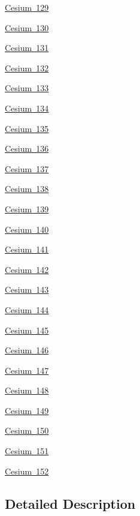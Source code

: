\begin{DoxyCompactItemize}
\item 
\mbox{\hyperlink{group___isotope_const-_cesium-_cs129}{Cesium 129}}
\item 
\mbox{\hyperlink{group___isotope_const-_cesium-_cs130}{Cesium 130}}
\item 
\mbox{\hyperlink{group___isotope_const-_cesium-_cs131}{Cesium 131}}
\item 
\mbox{\hyperlink{group___isotope_const-_cesium-_cs132}{Cesium 132}}
\item 
\mbox{\hyperlink{group___isotope_const-_cesium-_cs133}{Cesium 133}}
\item 
\mbox{\hyperlink{group___isotope_const-_cesium-_cs134}{Cesium 134}}
\item 
\mbox{\hyperlink{group___isotope_const-_cesium-_cs135}{Cesium 135}}
\item 
\mbox{\hyperlink{group___isotope_const-_cesium-_cs136}{Cesium 136}}
\item 
\mbox{\hyperlink{group___isotope_const-_cesium-_cs137}{Cesium 137}}
\item 
\mbox{\hyperlink{group___isotope_const-_cesium-_cs138}{Cesium 138}}
\item 
\mbox{\hyperlink{group___isotope_const-_cesium-_cs139}{Cesium 139}}
\item 
\mbox{\hyperlink{group___isotope_const-_cesium-_cs140}{Cesium 140}}
\item 
\mbox{\hyperlink{group___isotope_const-_cesium-_cs141}{Cesium 141}}
\item 
\mbox{\hyperlink{group___isotope_const-_cesium-_cs142}{Cesium 142}}
\item 
\mbox{\hyperlink{group___isotope_const-_cesium-_cs143}{Cesium 143}}
\item 
\mbox{\hyperlink{group___isotope_const-_cesium-_cs144}{Cesium 144}}
\item 
\mbox{\hyperlink{group___isotope_const-_cesium-_cs145}{Cesium 145}}
\item 
\mbox{\hyperlink{group___isotope_const-_cesium-_cs146}{Cesium 146}}
\item 
\mbox{\hyperlink{group___isotope_const-_cesium-_cs147}{Cesium 147}}
\item 
\mbox{\hyperlink{group___isotope_const-_cesium-_cs148}{Cesium 148}}
\item 
\mbox{\hyperlink{group___isotope_const-_cesium-_cs149}{Cesium 149}}
\item 
\mbox{\hyperlink{group___isotope_const-_cesium-_cs150}{Cesium 150}}
\item 
\mbox{\hyperlink{group___isotope_const-_cesium-_cs151}{Cesium 151}}
\item 
\mbox{\hyperlink{group___isotope_const-_cesium-_cs152}{Cesium 152}}
\end{DoxyCompactItemize}


\subsection{Detailed Description}
